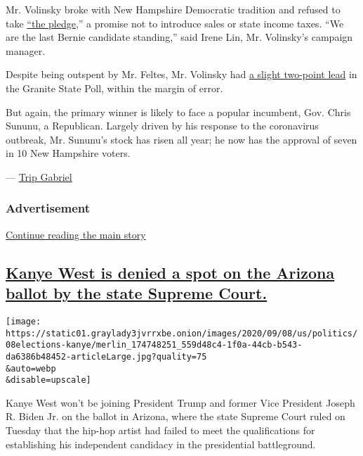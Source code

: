 Mr. Volinsky broke with New Hampshire Democratic tradition and refused
to take
\href{https://www.nhpr.org/post/nh-democrats-running-office-political-pull-pledge-remains-strong\#stream/0}{``the
pledge},'' a promise not to introduce sales or state income taxes. ``We
are the last Bernie candidate standing,'' said Irene Lin, Mr. Volinsky's
campaign manager.

Despite being outspent by Mr. Feltes, Mr. Volinsky had
\href{https://scholars.unh.edu/survey_center_polls/605/}{a slight
two-point lead} in the Granite State Poll, within the margin of error.

But again, the primary winner is likely to face a popular incumbent,
Gov. Chris Sununu, a Republican. Largely driven by his response to the
coronavirus outbreak, Mr. Sununu's stock has risen all year; he now has
the approval of seven in 10 New Hampshire voters.

--- \href{https://www.nytimes3xbfgragh.onion/by/trip-gabriel}{Trip
Gabriel}

\hypertarget{advertisement-3}{%
\subsubsection{Advertisement}\label{advertisement-3}}

\protect\hyperlink{after-dfp-ad-mid4}{Continue reading the main story}

\hypertarget{kanye-west-is-denied-a-spot-on-the-arizona-ballot-by-the-state-supreme-court}{%
\subsection{\texorpdfstring{\protect\hyperlink{kanye-west-is-denied-a-spot-on-the-arizona-ballot-by-the-state-supreme-court}{Kanye
West is denied a spot on the Arizona ballot by the state Supreme
Court.}}{Kanye West is denied a spot on the Arizona ballot by the state Supreme Court.}}\label{kanye-west-is-denied-a-spot-on-the-arizona-ballot-by-the-state-supreme-court}}

\texttt{[image: https://static01.graylady3jvrrxbe.onion/images/2020/09/08/us/politics/08elections-kanye/merlin\_174748251\_559d48c4-1f0a-44cb-b543-da6386b48452-articleLarge.jpg?quality=75\\\&auto=webp\\\&disable=upscale]}

Kanye West won't be joining President Trump and former Vice President
Joseph R. Biden Jr. on the ballot in Arizona, where the state Supreme
Court ruled on Tuesday that the hip-hop artist had failed to meet the
qualifications for establishing his independent candidacy in the
presidential battleground.

